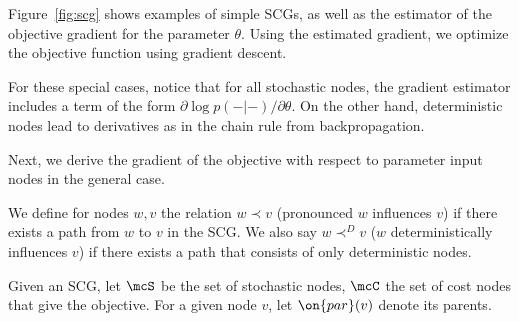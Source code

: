 \documentclass[12pt]{report}
\begin{document}
Figure~\ref{fig:scg} shows examples of simple SCGs, as well as the estimator of the objective gradient for the parameter $\theta$. Using the estimated gradient, we optimize the objective function using gradient descent.

For these special cases, notice that for all stochastic nodes, the gradient estimator includes a term of the form $\partial \log p( - | -) / \partial \theta$. On the other hand, deterministic nodes lead to derivatives as in the chain rule from backpropagation.

Next, we derive the gradient of the objective with respect to parameter input nodes in the general case.

We define for nodes $w,v$ the relation $w \prec v$ (pronounced $w$ influences $v$) if there exists a path from $w$ to $v$ in the SCG. We also say $w \prec^D v$ ($w$ deterministically influences $v$) if there exists a path that consists of only deterministic nodes.

Given an SCG, let $\mcS$ be the set of stochastic nodes, $\mcC$ the set of cost nodes that give the objective. For a given node $v$, let $\on{par}(v)$ denote its parents.
\end{document}
